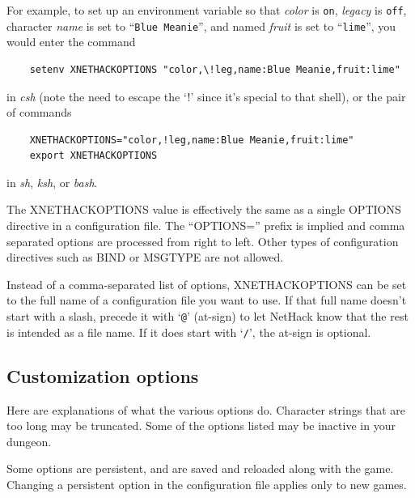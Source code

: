 \documentclass[titlepage]{article}
\begin{document}
For example, to set up an environment variable so that
\textit{color} is \texttt{on},
\textit{legacy} is \texttt{off},
character \textit{name} is set to ``\texttt{Blue Meanie}'',
and named \textit{fruit} is set to ``\texttt{lime}'',
you would enter the command
\begin{verbatim}
    setenv XNETHACKOPTIONS "color,\!leg,name:Blue Meanie,fruit:lime"
\end{verbatim}

\noindent in \textit{csh}
(note the need to escape the `!' since it's special
to that shell), or the pair of commands
\begin{verbatim}
    XNETHACKOPTIONS="color,!leg,name:Blue Meanie,fruit:lime"
    export XNETHACKOPTIONS
\end{verbatim}

\noindent in \textit{sh}, \textit{ksh}, or \textit{bash}.

The XNETHACKOPTIONS value is effectively the same as a single OPTIONS
directive in a configuration file.
The ``OPTIONS='' prefix is implied and comma separated options are
processed from right to left.
Other types of configuration directives such as BIND or MSGTYPE are
not allowed.

Instead of a comma-separated list of options,
XNETHACKOPTIONS can be set to the full name of a configuration file you
want to use.
If that full name doesn't start with a slash, precede it with `\texttt{@}'
(at-sign) to let NetHack know that the rest is intended as a file name.
If it does start with `\texttt{/}', the at-sign is optional.

\subsection*{Customization options}

Here are explanations of what the various options do.
Character strings that are too long may be truncated.
Some of the options listed may be inactive in your dungeon.

Some options are persistent, and are saved and reloaded along with
the game.  Changing a persistent option in the configuration file
applies only to new games.
\end{document}
